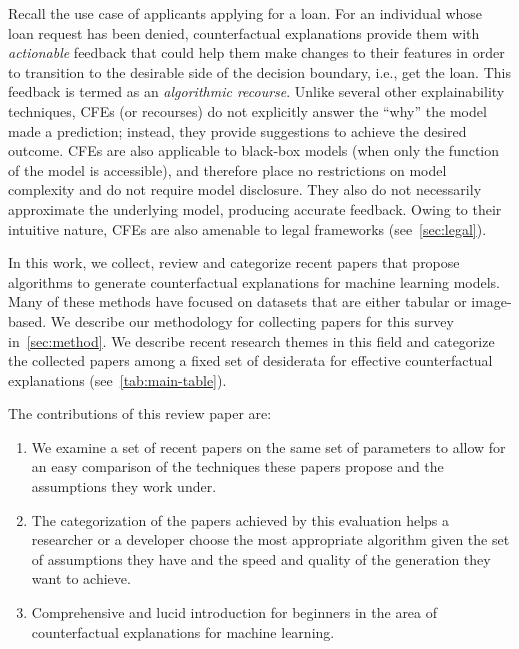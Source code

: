 Recall the use case of applicants applying for a loan. For an individual whose loan request has been denied, counterfactual explanations provide them with \emph{actionable} feedback that could help them make changes to their features in order to transition to the desirable side of the decision boundary, i.e., get the loan. This feedback is termed as an \emph{algorithmic recourse}. 
Unlike several other explainability techniques, CFEs (or recourses) do not explicitly answer the ``why'' the model made a prediction; instead, they provide suggestions to achieve the desired outcome. 
CFEs are also applicable to black-box models (when only the  function of the model is accessible), and therefore place no restrictions on model complexity and do not require model disclosure. 
They also do not necessarily approximate the underlying model, producing accurate feedback. 
Owing to their intuitive nature, CFEs are also amenable to legal frameworks (see~\cref{sec:legal}). 



In this work, we collect, review and categorize \papers %
recent papers that propose algorithms to generate counterfactual explanations for machine learning models. Many of these methods have focused on datasets that are either tabular or image-based. 
We describe our methodology for collecting papers for this survey in~\cref{sec:method}. 
We describe recent research themes in this field and categorize the collected papers among a fixed set of desiderata for effective counterfactual explanations (see~\cref{tab:main-table}). 


The contributions of this review paper are:
\begin{enumerate}
    \item We examine a set of \papers recent papers on the same set of parameters to allow for an easy comparison of the techniques these papers propose and the assumptions they work under. 
    \item The categorization of the papers achieved by this evaluation helps a researcher or a developer choose the most appropriate algorithm given the set of assumptions they have and the speed and quality of the generation they want to achieve. 
    \item Comprehensive and lucid introduction for beginners in the area of counterfactual explanations for machine learning. 
\end{enumerate}



